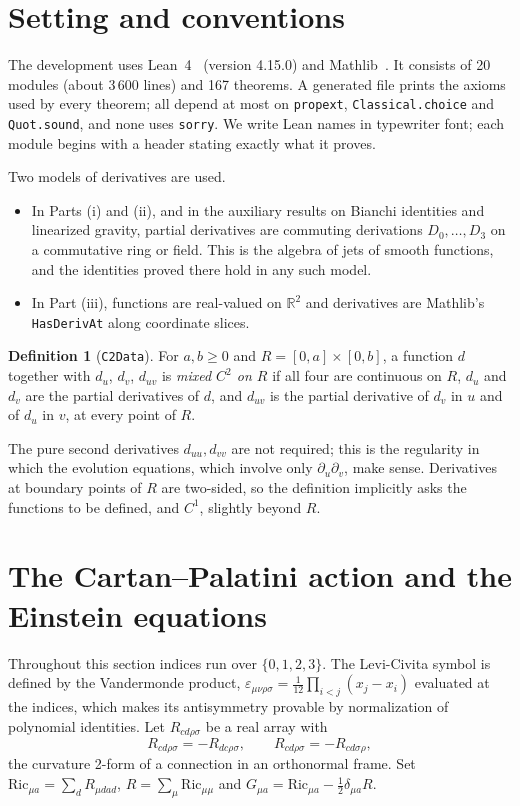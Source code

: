 \documentclass[11pt]{amsart}
\theoremstyle{definition}
\newtheorem{definition}[theorem]{Definition}
\theoremstyle{remark}
\newcommand{\lean}[1]{\texttt{#1}}
\newcommand{\R}{\mathbb{R}}
\begin{document}
\section{Setting and conventions}\label{sec:setting}

The development uses Lean~4~\cite{deMouraUllrich2021} (version 4.15.0) and Mathlib~\cite{mathlib2020}. It consists of 20 modules (about 3\,600 lines) and 167 theorems. A generated file prints the axioms used by every theorem; all depend at most on \lean{propext}, \lean{Classical.choice} and \lean{Quot.sound}, and none uses \lean{sorry}. We write Lean names in typewriter font; each module begins with a header stating exactly what it proves.

Two models of derivatives are used.
\begin{itemize}
\item In Parts (i) and (ii), and in the auxiliary results on Bianchi identities and linearized gravity, partial derivatives are commuting derivations $D_0,\dots,D_3$ on a commutative ring or field. This is the algebra of jets of smooth functions, and the identities proved there hold in any such model.
\item In Part (iii), functions are real-valued on $\R^2$ and derivatives are Mathlib's \lean{HasDerivAt} along coordinate slices.
\end{itemize}

\begin{definition}[\lean{C2Data}]\label{def:c2}
For $a,b\ge0$ and $R=[0,a]\times[0,b]$, a function $d$ together with $d_u$, $d_v$, $d_{uv}$ is \emph{mixed $C^2$ on $R$} if all four are continuous on $R$, $d_u$ and $d_v$ are the partial derivatives of $d$, and $d_{uv}$ is the partial derivative of $d_v$ in $u$ and of $d_u$ in $v$, at every point of $R$.
\end{definition}
The pure second derivatives $d_{uu},d_{vv}$ are not required; this is the regularity in which the evolution equations, which involve only $\partial_u\partial_v$, make sense. Derivatives at boundary points of $R$ are two-sided, so the definition implicitly asks the functions to be defined, and $C^1$, slightly beyond $R$.

\section{The Cartan--Palatini action and the Einstein equations}\label{sec:action}

Throughout this section indices run over $\{0,1,2,3\}$. The Levi-Civita symbol is defined by the Vandermonde product, $\varepsilon_{\mu\nu\rho\sigma}=\frac{1}{12}\prod_{i<j}(x_j-x_i)$ evaluated at the indices, which makes its antisymmetry provable by normalization of polynomial identities. Let $R_{cd\rho\sigma}$ be a real array with
\begin{equation}\label{eq:antisym}
R_{cd\rho\sigma}=-R_{dc\rho\sigma},\qquad R_{cd\rho\sigma}=-R_{cd\sigma\rho},
\end{equation}
the curvature 2-form of a connection in an orthonormal frame. Set $\mathrm{Ric}_{\mu a}=\sum_d R_{\mu d a d}$, $R=\sum_\mu \mathrm{Ric}_{\mu\mu}$ and $G_{\mu a}=\mathrm{Ric}_{\mu a}-\frac12\delta_{\mu a}R$.
\end{document}
